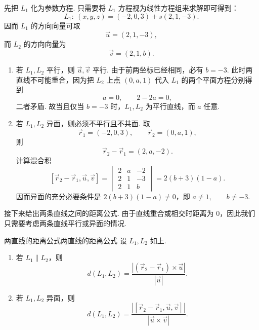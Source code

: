 \begin{solution}
    先把 $L_1$ 化为参数方程. 只需要将 $L_1$ 方程视为线性方程组来求解即可得到：
    \[
        L_1:\ (x, y, z) = (-2, 0, 3) + s (2, 1, -3).
    \]
    因而 $L_1$ 的方向向量可取
    \[
        \vec{u} = (2, 1, -3),
    \]
    而 $L_2$ 的方向向量为
    \[
        \vec{v} = (2, 1, b).
    \]

    \begin{enumerate}
        \item 若 $L_1, L_2$ 平行，则 $\vec{u}, \vec{v}$ 平行. 由于前两坐标已经相同，必有 $b = -3$. 此时两直线不可能重合，因为把 $L_2$ 上点 $(0, a, 1)$ 代入 $L_1$ 的两个平面方程分别得到
        \[
            a = 0, \qquad 2 - 2a = 0,
        \]
        二者矛盾. 故当且仅当 $b = -3$ 时，$L_1, L_2$ 为平行直线，而 $a$ 任意.

        \item 若 $L_1, L_2$ 异面，则必须不平行且不共面. 取
        \[
            \vec{r}_1 = (-2, 0, 3), \qquad \vec{r}_2 = (0, a, 1),
        \]
        则
        \[
            \vec{r}_2 - \vec{r}_1 = (2, a, -2).
        \]
        计算混合积
        \[
            [\vec{r}_2 - \vec{r}_1, \vec{u}, \vec{v}]
            =
            \begin{vmatrix}
                2 & a & -2 \\
                2 & 1 & -3 \\
                2 & 1 & b
            \end{vmatrix}
            = 2(b + 3)(1 - a).
        \]
        因而异面的充分必要条件是 $2(b + 3)(1 - a) \neq 0$，即 $a \neq 1, \qquad b \neq -3$.
    \end{enumerate}
\end{solution}

接下来给出两条直线之间的距离公式. 由于直线重合或相交时距离为 $0$，因此我们只需要考虑两条直线平行或异面的情况.

\begin{theorem}{两直线的距离公式}{两直线的距离公式}
    设 $L_1, L_2$ 如上.
    \begin{enumerate}
        \item 若 $L_1 \parallel L_2$，则
        \[
            d(L_1, L_2) = \frac{|(\vec{r}_2 - \vec{r}_1)\times \vec{u}|}{|\vec{u}|}.
        \]
        \item 若 $L_1, L_2$ 异面，则
        \[
            d(L_1, L_2) = \frac{|[\vec{r}_2 - \vec{r}_1, \vec{u}, \vec{v}]|}{|\vec{u}\times\vec{v}|}.
        \]
    \end{enumerate}
\end{theorem}


